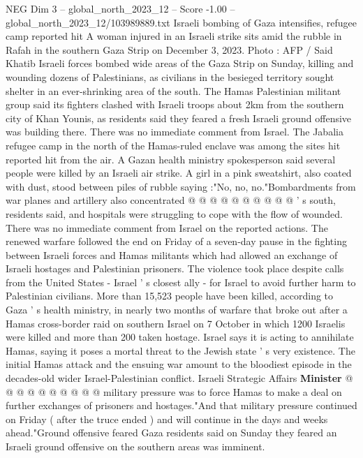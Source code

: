 \begin{textsample}{NEG Dim 3 – global\_north\_2023\_12 – Score -1.00 – global\_north\_2023\_12/103989889.txt}  \label{ex:f3_neg_237}
Israeli bombing of Gaza intensifies, refugee camp reported hit A woman injured in an Israeli strike sits amid the rubble in Rafah in the southern Gaza Strip on December 3, 2023.
Photo : AFP / Said Khatib Israeli forces bombed wide areas of the Gaza Strip on Sunday, killing and wounding dozens of Palestinians, as civilians in the besieged territory sought shelter in an ever-shrinking area of the south.
The Hamas Palestinian militant group said its fighters clashed with Israeli troops about 2km from the southern city of Khan Younis, as residents said they feared a fresh Israeli ground offensive was building there.
There was no immediate comment from Israel.
The Jabalia refugee camp in the north of the Hamas-ruled enclave was among the sites hit reported hit from the air.
A Gazan health ministry spokesperson said several people were killed by an Israeli air strike.
A girl in a pink sweatshirt, also coated with dust, stood between piles of rubble saying :"No, no, no."Bombardments from war planes and artillery also concentrated @ @ @ @ @ @ @ @ @ @ ' s south, residents said, and hospitals were struggling to cope with the flow of wounded.
There was no immediate comment from Israel on the reported actions.
The renewed warfare followed the end on Friday of a seven-day pause in the fighting between Israeli forces and Hamas militants which had allowed an exchange of Israeli hostages and Palestinian prisoners.
The violence took place despite calls from the United States - Israel ' s closest ally - for Israel to avoid further harm to Palestinian civilians.
More than 15,523 people have been killed, according to Gaza ' s health ministry, in nearly two months of warfare that broke out after a Hamas cross-border raid on southern Israel on 7 October in which 1200 Israelis were killed and more than 200 taken hostage.
Israel says it is acting to annihilate Hamas, saying it poses a mortal threat to the Jewish state ' s very existence.
The initial Hamas attack and the ensuing war amount to the bloodiest episode in the decades-old wider Israel-Palestinian conflict.
Israeli Strategic Affairs \textbf{Minister} @ @ @ @ @ @ @ @ @ @ military pressure was to force Hamas to make a deal on further exchanges of prisoners and hostages."And that military pressure continued on Friday ( after the truce ended ) and will continue in the days and weeks ahead."Ground offensive feared Gaza residents said on Sunday they feared an Israeli ground offensive on the southern areas was imminent.

\end{textsample}
